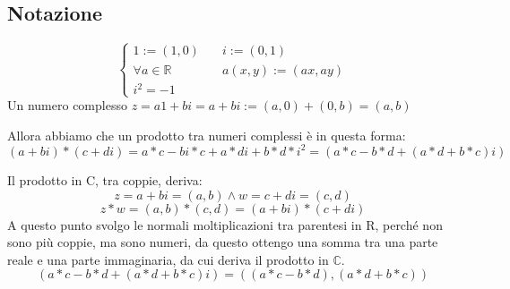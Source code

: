 \documentclass[a4paper,12pt]{article}
\begin{document}
	\subsection{Notazione}
	\[
	\left\{
	\begin{aligned}
		1:= (1, 0) \quad & i := (0, 1) \\
		\forall a \in \mathbb{R} \quad \quad & a(x, y) :=(ax, ay) \\
		i^2 = -1 \quad \;\;\;& 
	\end{aligned}
	\right.
	\]
	Un numero complesso $z = a1 + bi = a + bi := (a, 0) + (0, b) = (a, b)$
	
	Allora abbiamo che un prodotto tra numeri complessi è in questa forma:
	\[(a + bi) * (c + di) = a * c - bi * c + a * di + b * d * i^2 = (a*c - b*d + (a*d + b*c)i)\]
	
	Il prodotto in C, tra coppie, deriva:
	\[z = a + bi = (a, b) \wedge w = c + di = (c, d)\] 
	\[z * w = (a, b) * (c, d) = (a + bi) * (c + di)\]
	A questo punto svolgo le normali moltiplicazioni tra parentesi in R, perché non sono più coppie, ma sono numeri,  da questo ottengo una somma tra una parte reale e una parte immaginaria, da cui deriva il prodotto in $\mathbb{C}$.
	\[(a*c - b*d + (a*d + b*c)i) = ((a*c - b*d), (a*d + b*c))\]
	
\end{document}
